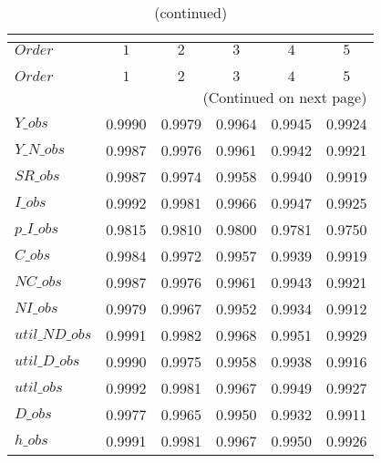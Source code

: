  
\begin{center}
\begin{longtable}{lccccc} 
\caption{COEFFICIENTS OF AUTOCORRELATION}\\
 \label{Table:th_autocorr_matrix}\\
\toprule 
$Order          $	 & 	 $         1$	 & 	 $         2$	 & 	 $         3$	 & 	 $         4$	 & 	 $         5$\\
\midrule \endfirsthead 
\caption{(continued)}\\
 \toprule \\ 
$Order          $	 & 	 $         1$	 & 	 $         2$	 & 	 $         3$	 & 	 $         4$	 & 	 $         5$\\
\midrule \endhead 
\midrule \multicolumn{6}{r}{(Continued on next page)} \\ \bottomrule \endfoot 
\bottomrule \endlastfoot 
$Y\_obs         $	 & 	    0.9990	 & 	    0.9979	 & 	    0.9964	 & 	    0.9945	 & 	    0.9924 \\ 
$Y\_N\_obs      $	 & 	    0.9987	 & 	    0.9976	 & 	    0.9961	 & 	    0.9942	 & 	    0.9921 \\ 
$SR\_obs        $	 & 	    0.9987	 & 	    0.9974	 & 	    0.9958	 & 	    0.9940	 & 	    0.9919 \\ 
$I\_obs         $	 & 	    0.9992	 & 	    0.9981	 & 	    0.9966	 & 	    0.9947	 & 	    0.9925 \\ 
$p\_I\_obs      $	 & 	    0.9815	 & 	    0.9810	 & 	    0.9800	 & 	    0.9781	 & 	    0.9750 \\ 
$C\_obs         $	 & 	    0.9984	 & 	    0.9972	 & 	    0.9957	 & 	    0.9939	 & 	    0.9919 \\ 
$NC\_obs        $	 & 	    0.9987	 & 	    0.9976	 & 	    0.9961	 & 	    0.9943	 & 	    0.9921 \\ 
$NI\_obs        $	 & 	    0.9979	 & 	    0.9967	 & 	    0.9952	 & 	    0.9934	 & 	    0.9912 \\ 
$util\_ND\_obs  $	 & 	    0.9991	 & 	    0.9982	 & 	    0.9968	 & 	    0.9951	 & 	    0.9929 \\ 
$util\_D\_obs   $	 & 	    0.9990	 & 	    0.9975	 & 	    0.9958	 & 	    0.9938	 & 	    0.9916 \\ 
$util\_obs      $	 & 	    0.9992	 & 	    0.9981	 & 	    0.9967	 & 	    0.9949	 & 	    0.9927 \\ 
$D\_obs         $	 & 	    0.9977	 & 	    0.9965	 & 	    0.9950	 & 	    0.9932	 & 	    0.9911 \\ 
$h\_obs         $	 & 	    0.9991	 & 	    0.9981	 & 	    0.9967	 & 	    0.9950	 & 	    0.9926 \\ 
\end{longtable}
 \end{center}
